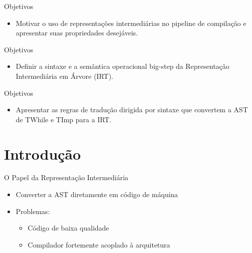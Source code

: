 \subtitle{\bf Aula 17 - Introdução}
\begin{frame}[t,plain]
    \titlepage
\end{frame}

\begin{frame}{Objetivos}

    \begin{itemize}

        \item
        Motivar o uso de representações intermediárias no pipeline de
        compilação e apresentar suas propriedades desejáveis.
    \end{itemize}
\end{frame}

\begin{frame}{Objetivos}

    \begin{itemize}

        \item
        Definir a sintaxe e a semântica operacional big-step da Representação
        Intermediária em Árvore (IRT).
    \end{itemize}
\end{frame}

\begin{frame}{Objetivos}

    \begin{itemize}

        \item
        Apresentar as regras de tradução dirigida por sintaxe que convertem a
        AST de TWhile e TImp para a IRT.
    \end{itemize}
\end{frame}


\section{Introdução}\label{introduuxe7uxe3o}

\begin{frame}{O Papel da Representação Intermediária}

    \begin{itemize}

        \item
        Converter a AST diretamente em código de máquina
        \item
        Problemas:

        \begin{itemize}

            \item
            Código de baixa qualidade
            \item
            Compilador fortemente acoplado à arquitetura
        \end{itemize}
    \end{itemize}
\end{frame}

